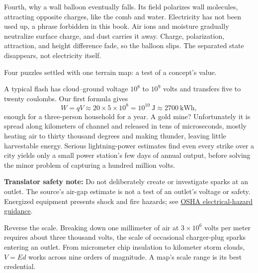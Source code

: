 \begin{mainline}
Fourth, why a wall balloon eventually falls. Its field polarizes wall molecules, attracting opposite charges, like the comb and water. Electricity has not been used up, a phrase forbidden in this book. Air ions and moisture gradually neutralize surface charge, and dust carries it away. Charge, polarization, attraction, and height difference fade, so the balloon slips. The separated state disappears, not electricity itself.

Four puzzles settled with one terrain map: a test of a concept's value.
\end{mainline}


\begin{thought}
A typical flash has cloud--ground voltage \(10^{8}\) to \(10^{9}\) volts and transfers five to twenty coulombs. Our first formula gives
\[
W = qV \approx 20\times 5\times10^{8} = 10^{10}\ \text{J} \approx 2700\ \text{kWh},
\]
enough for a three-person household for a year. A gold mine? Unfortunately it is spread along kilometers of channel and released in tens of microseconds, mostly heating air to thirty thousand degrees and making thunder, leaving little harvestable energy. Serious lightning-power estimates find even every strike over a city yields only a small power station's few days of annual output, before solving the minor problem of capturing a hundred million volts.

\textbf{Translator safety note:} Do not deliberately create or investigate sparks at an outlet. The source's air-gap estimate is not a test of an outlet's voltage or safety. Energized equipment presents shock and fire hazards; see \href{https://www.osha.gov/etools/poultry-processing/plant-wide-hazards/electrical-hazards}{OSHA electrical-hazard guidance}.

Reverse the scale. Breaking down one millimeter of air at \(3\times10^{6}\) volts per meter requires about three thousand volts, the scale of occasional charger-plug sparks entering an outlet. From micrometer chip insulation to kilometer storm clouds, \(V=Ed\) works across nine orders of magnitude. A map's scale range is its best credential.
\end{thought}

